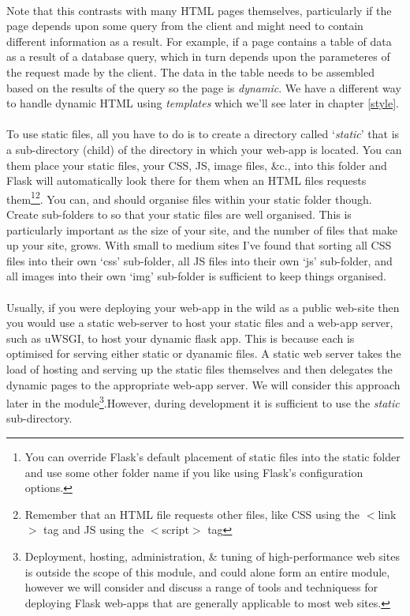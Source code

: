 \documentclass[12pt, a4paper, oneside]{book}
\begin{document}
\paragraph{} Note that this contrasts with many HTML pages themselves, particularly if the page depends upon some query from the client and might need to contain different information as a result. For example, if a page contains a table of data as a result of a database query, which in turn depends upon the parameteres of the request made by the client. The data in the table needs to be assembled based on the results of the query so the page is \emph{dynamic}. We have a different way to handle dynamic HTML using \emph{templates} which we'll see later in chapter \ref{style}.

\paragraph{} To use static files, all you have to do is to create a directory called `\emph{static}' that is a sub-directory (child) of the directory in which your web-app is located. You can them place your static files, your CSS, JS, image files, \&c., into this folder and Flask will automatically look there for them when an HTML files requests them\footnote{You can override Flask's default placement of static files into the static folder and use some other folder name if you like using Flask's configuration options.}\footnote{Remember that an HTML file requests other files, like CSS using the $<$link$>$ tag and JS using the $<$script$>$ tag}. You can, and should organise files within your static folder though. Create sub-folders to so that your static files are well organised. This is particularly important as the size of your site, and the number of files that make up your site, grows. With small to medium sites I've found that sorting all CSS files into their own `css' sub-folder, all JS files into their own `js' sub-folder, and all images into their own `img' sub-folder is sufficient to keep things organised.

\paragraph{} Usually, if you were deploying your web-app in the wild as a public web-site then you would use a static web-server to host your static files and a web-app server, such as uWSGI, to host your dynamic flask app. This is because each is optimised for serving either static or dyanamic files. A static web server takes the load of hosting and serving up the static files themselves and then delegates the dynamic pages to the appropriate web-app server. We will consider this approach later in the module\footnote{Deployment, hosting, administration, \& tuning of high-performance web sites is outside the scope of this module, and could alone form an entire module, however we will consider and discuss a range of tools and techniquess for deploying Flask web-apps that are generally applicable to most web sites.}.However, during development it is sufficient to use the \emph{static} sub-directory. 
\end{document}
